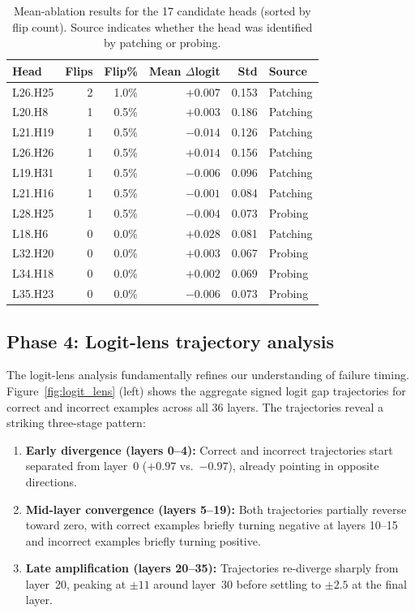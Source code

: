 \documentclass{article}
\begin{document}
\begin{table}[t]
\centering
\small
\caption{Mean-ablation results for the 17 candidate heads (sorted by flip count). Source indicates whether the head was identified by patching or probing.}
\label{tab:ablation}
\begin{tabular}{lrrrrl}
\toprule
\textbf{Head} & \textbf{Flips} & \textbf{Flip\%} & \textbf{Mean $\Delta$logit} & \textbf{Std} & \textbf{Source} \\
\midrule
L26.H25 & 2 & 1.0\% & $+0.007$ & 0.153 & Patching \\
L20.H8  & 1 & 0.5\% & $+0.003$ & 0.186 & Patching \\
L21.H19 & 1 & 0.5\% & $-0.014$ & 0.126 & Patching \\
L26.H26 & 1 & 0.5\% & $+0.014$ & 0.156 & Patching \\
L19.H31 & 1 & 0.5\% & $-0.006$ & 0.096 & Patching \\
L21.H16 & 1 & 0.5\% & $-0.001$ & 0.084 & Patching \\
L28.H25 & 1 & 0.5\% & $-0.004$ & 0.073 & Probing \\
\midrule
L18.H6  & 0 & 0.0\% & $+0.028$ & 0.081 & Patching \\
L32.H20 & 0 & 0.0\% & $+0.003$ & 0.067 & Probing \\
L34.H18 & 0 & 0.0\% & $+0.002$ & 0.069 & Probing \\
L35.H23 & 0 & 0.0\% & $-0.006$ & 0.073 & Probing \\
\bottomrule
\end{tabular}
\end{table}

\subsection{Phase 4: Logit-lens trajectory analysis}

The logit-lens analysis fundamentally refines our understanding of failure timing.
Figure~\ref{fig:logit_lens} (left) shows the aggregate signed logit gap trajectories for correct and incorrect examples across all 36 layers.
The trajectories reveal a striking three-stage pattern:

\begin{enumerate}
    \item \textbf{Early divergence (layers 0--4):} Correct and incorrect trajectories start separated from layer~0 ($+0.97$ vs.\ $-0.97$), already pointing in opposite directions.
    \item \textbf{Mid-layer convergence (layers 5--19):} Both trajectories partially reverse toward zero, with correct examples briefly turning negative at layers 10--15 and incorrect examples briefly turning positive.
    \item \textbf{Late amplification (layers 20--35):} Trajectories re-diverge sharply from layer~20, peaking at $\pm 11$ around layer~30 before settling to $\pm 2.5$ at the final layer.
\end{enumerate}
\end{document}
